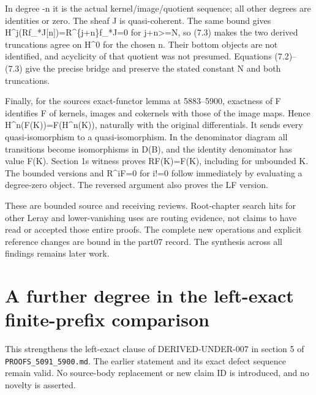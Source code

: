 \documentclass[11pt]{article}
\begin{document}
In degree -n it is the actual kernel/\allowbreak{}image/\allowbreak{}quotient sequence; all other degrees are identities or zero. The sheaf J is quasi-coherent. The same bound gives H\textasciicircum{}j(Rf\_\allowbreak{}*J[n]\allowbreak{})\allowbreak{}\allowbreak{}=R\textasciicircum{}\{j\allowbreak{}+n\}f\_\allowbreak{}*J\allowbreak{}=0 for j\allowbreak{}+n>\allowbreak{}=N,\allowbreak{} so (7.3)\allowbreak{} makes the two derived truncations agree on H\^{}0 for the chosen n. Their bottom objects are not identified,\allowbreak{} and acyclicity of that quotient was not presumed. Equations (7.2)\allowbreak{}–\allowbreak{}(7.3)\allowbreak{} give the precise bridge and preserve the stated constant N and both truncations.

Finally,\allowbreak{} for the source\textquotesingle s exact-functor lemma at 5883–\allowbreak{}5900,\allowbreak{} exactness of F identifies F of kernels,\allowbreak{} images and cokernels with those of the image maps. Hence H\textasciicircum{}n(F(K)\allowbreak{})\allowbreak{}\allowbreak{}=F(H\textasciicircum{}n(K)\allowbreak{})\allowbreak{},\allowbreak{} naturally with the original differentials. It sends every quasi-isomorphism to a quasi-isomorphism. In the denominator diagram all transitions become isomorphisms in D(B)\allowbreak{},\allowbreak{} and the identity denominator has value F(K)\allowbreak{}. Section 1\textquotesingle s witness proves RF(K)\allowbreak{}\allowbreak{}=F(K)\allowbreak{},\allowbreak{} including for unbounded K. The bounded versions and R\textasciicircum{}iF\allowbreak{}=0 for i!\allowbreak{}=0 follow immediately by evaluating a degree-zero object. The reversed argument also proves the LF version.

These are bounded source and receiving reviews. Root-chapter search hits for other Leray and lower-vanishing uses are routing evidence,\allowbreak{} not claims to have read or accepted those entire proofs. The complete new operations and explicit reference changes are bound in the part07 record. The synthesis across all findings remains later work.
\clearpage
\section{A further degree in the left-exact finite-prefix comparison}\label{proofs-5091-5900-addendum-01-a-further-degree-in-the-left-exact-finite-prefix-comparison}

This strengthens the left-exact clause of DERIVED-UNDER-007 in section 5 of \texttt{PROOFS\_\allowbreak{}5091\_\allowbreak{}5900.\allowbreak{}md}. The earlier statement and its exact defect sequence remain valid. No source-body replacement or new claim ID is introduced,\allowbreak{} and no novelty is asserted.
\end{document}
